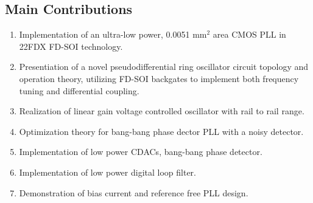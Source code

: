 %

\vspace{1em}

\subsection{Main Contributions}
\vspace{-0.8em}
\begin{enumerate}[itemsep=0pt,label=\protect\mycirc{\arabic*}]
	\setlength\itemsep{-0.8em}
	\item Implementation of an ultra-low power, 0.0051 mm$^2$ area CMOS PLL in 22FDX FD-SOI technology.
	\item Presentiation of a novel pseudodifferential ring oscillator circuit topology and operation theory, utilizing FD-SOI backgates to implement both frequency tuning and differential coupling.
	\item Realization of linear gain voltage controlled oscillator with rail to rail range. 
	\item Optimization theory for bang-bang phase dector PLL with a noisy detector.
	\item Implementation of low power CDACs, bang-bang phase detector.
	\item Implementation of low power digital loop filter.
	\item Demonstration of bias current and reference free PLL design.
\end{enumerate}
